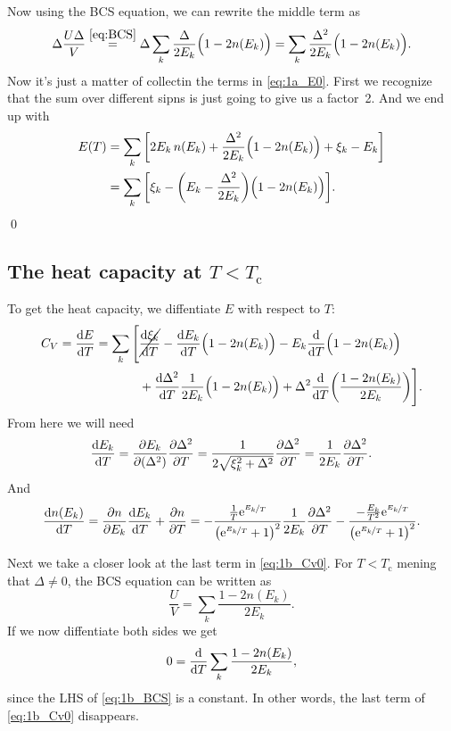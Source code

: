 \documentclass[11pt,letter, swedish, english
]{article}
\newcommand{\Tc}{\ensuremath{T_{\text{c}}}}
\begin{document}
Now using the BCS equation, we can rewrite the middle
term as
\begin{equation}
\Delta\frac{U\Delta}{V} \stackrel{\eqref{eq:BCS}}{=}
\Delta\sum_k \frac{\Delta}{2E_k}\Big(1-2n(E_k)\Big)
=\sum_k \frac{\Delta^2}{2E_k}\Big(1-2n(E_k)\Big).
\end{equation}
Now it's just a matter of collectin the terms in
\eqref{eq:1a_E0}. First we recognize that the sum over different sipns
is just going to give us a factor~2. And we end up with
\begin{equation}
\begin{aligned}
E(T)&=\sum_k\qty[2E_k\,n(E_k)
+\frac{\Delta^2}{2E_k}\Big(1-2n(E_k)\Big)
+\xi_k-E_k ]\\
&=\sum_k\qty[
\xi_k-\qty(E_k-\frac{\Delta^2}{2E_k})\Big(1-2n(E_k)\Big) ].
\end{aligned}
\end{equation}
\qed

\subsection{The heat capacity at $T<\Tc$}
To get the heat capacity, we diffentiate $E$ with respect to $T$:
\begin{equation}\label{eq:1b_Cv0}
\begin{aligned}
C_V=\dv{E}{T}=\sum_k\Bigg[&
\cancel{\dv{\xi_k}{T}}-\dv{E_k}{T}\Big(1-2n(E_k)\Big)
-E_k\dv{T}\Big(1-2n(E_k)\Big)\\
&+\dv{\Delta^2}{T}\frac{1}{2E_k}\Big(1-2n(E_k)\Big) 
+\Delta^2 \dv{T}\qty(\frac{1-2n(E_k)}{2E_k})
\Bigg].
\end{aligned}
\end{equation}
From here we will need 
\begin{equation}\label{eq:1b_dEk/dT}
\dv{E_k}{T}=\pdv{E_k}{(\Delta^2)}\pdv{\Delta^2}{T}
=\frac{1}{2\sqrt{\xi_k^2+\Delta^2}}\pdv{\Delta^2}{T}
=\frac{1}{2E_k}\pdv{\Delta^2}{T}.
\end{equation}
And
\begin{equation}\label{eq:1b_dn/dT}
\dv{n(E_k)}{T}=\pdv{n}{E_k}\dv{E_k}{T}+\pdv{n}{T}
=-\frac{\frac{1}{T}\mathrm{e}^{\nicefrac{E_k}{T}}}
{\qty(\mathrm{e}^{\nicefrac{E_k}{T}}+1)^2}\frac{1}{2E_k}\pdv{\Delta^2}{T}
-\frac{-\frac{E_k}{T^2}\mathrm{e}^{\nicefrac{E_k}{T}}}
{\qty(\mathrm{e}^{\nicefrac{E_k}{T}}+1)^2}.
\end{equation}

Next we take a closer look at the last term in \eqref{eq:1b_Cv0}. For
$T<\Tc$ mening that $\Delta\neq0$, the BCS equation can be written as
\begin{equation}\label{eq:1b_BCS}
\frac{U}{V}=\sum_k\frac{1-2n(E_k)}{2E_k}.
\end{equation}
If we now diffentiate both sides we get
\begin{equation}
0=\dv{T}\sum_k\frac{1-2n(E_k)}{2E_k},
\end{equation}
since the LHS of \eqref{eq:1b_BCS} is a constant. In other words, the
last term of \eqref{eq:1b_Cv0} disappears.
\end{document}
